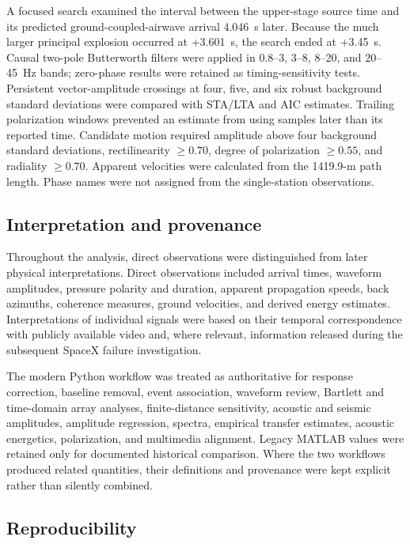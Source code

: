 \documentclass[]{seismica}
\begin{document}
A focused search examined the interval between the upper-stage source time and
its predicted ground-coupled-airwave arrival 4.046~s later. Because the much
larger principal explosion occurred at +3.601~s, the search ended at +3.45~s.
Causal two-pole Butterworth filters were applied in 0.8--3, 3--8, 8--20, and
20--45~Hz bands; zero-phase results were retained as timing-sensitivity tests.
Persistent vector-amplitude crossings at four, five, and six robust background
standard deviations were compared with STA/LTA and AIC estimates. Trailing
polarization windows prevented an estimate from using samples later than its
reported time. Candidate motion required amplitude above four background
standard deviations, rectilinearity $\geq0.70$, degree of polarization
$\geq0.55$, and radiality $\geq0.70$. Apparent velocities were calculated from
the 1419.9-m path length. Phase names were not assigned from the single-station
observations.

\subsection{Interpretation and provenance}

Throughout the analysis, direct observations were distinguished from later physical interpretations. Direct observations included arrival times, waveform amplitudes, pressure polarity and duration, apparent propagation speeds, back azimuths, coherence measures, ground velocities, and derived energy estimates. Interpretations of individual signals were based on their temporal correspondence with publicly available video and, where relevant, information released during the subsequent SpaceX failure investigation.

The modern Python workflow was treated as authoritative for response
correction, baseline removal, event association, waveform review, Bartlett and
time-domain array analyses, finite-distance sensitivity, acoustic and seismic
amplitudes, amplitude regression, spectra, empirical transfer estimates,
acoustic energetics, polarization, and multimedia alignment. Legacy MATLAB
values were retained only for documented historical comparison. Where the two
workflows produced related quantities, their definitions and provenance were
kept explicit rather than silently combined.

\subsection{Reproducibility}
\end{document}
